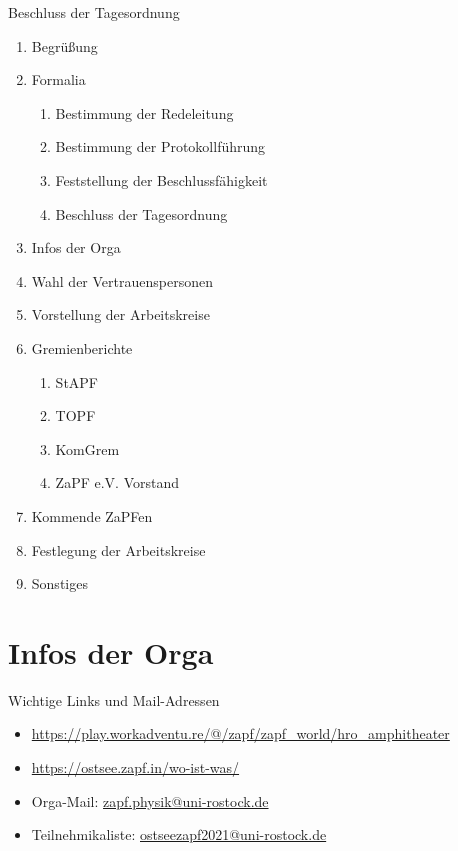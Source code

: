 \documentclass[compress, aspectratio=169]{beamer}
\begin{document}
	\begin{frame}{Beschluss der Tagesordnung}
		\begin{multicols}{2}
			\begin{enumerate}
				\item Begrüßung
				\item Formalia
				\begin{enumerate}
					\item Bestimmung der Redeleitung
					\item Bestimmung der Protokollführung
					\item Feststellung der Beschlussfähigkeit
					\item Beschluss der Tagesordnung
				\end{enumerate}
				\item Infos der Orga
				\item Wahl der Vertrauenspersonen
				\item Vorstellung der Arbeitskreise
				\item Gremienberichte
				\begin{enumerate}
					\item StAPF
					\item TOPF
					\item KomGrem
					\item ZaPF e.V. Vorstand
				\end{enumerate}
				\item Kommende ZaPFen
				\item Festlegung der Arbeitskreise
				\item Sonstiges
			\end{enumerate}
		\end{multicols}
	\end{frame}
	
\section{Infos der Orga}
	
\begin{frame}{Wichtige Links und Mail-Adressen}
\begin{itemize}
        \item \url{https://play.workadventu.re/@/zapf/zapf\_world/hro\_amphitheater}  \\
        \begin{center}
        \end{center}
        \item \url{https://ostsee.zapf.in/wo-ist-was/}   \\
        \begin{center}
        \end{center}
        \item Orga-Mail: \url{zapf.physik@uni-rostock.de}
        \item Teilnehmikaliste: \url{ostseezapf2021@uni-rostock.de}
\end{itemize}
\end{frame}
\end{document}
